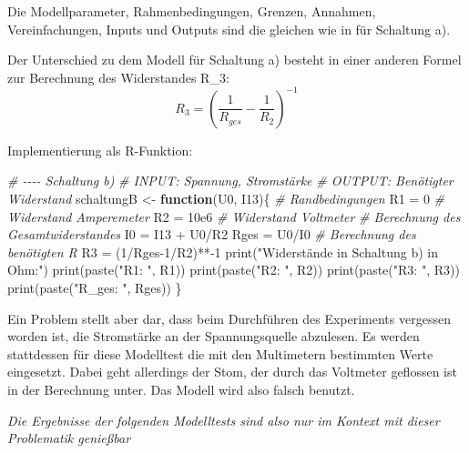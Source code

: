 \documentclass[class=article, crop=false]{standalone}
\newenvironment{Shaded}{\begin{snugshade}}{\end{snugshade}}
\newcommand{\CommentTok}[1]{\textcolor[rgb]{0.56,0.35,0.01}{\textit{#1}}}
\newcommand{\ControlFlowTok}[1]{\textcolor[rgb]{0.13,0.29,0.53}{\textbf{#1}}}
\newcommand{\DecValTok}[1]{\textcolor[rgb]{0.00,0.00,0.81}{#1}}
\newcommand{\FloatTok}[1]{\textcolor[rgb]{0.00,0.00,0.81}{#1}}
\newcommand{\FunctionTok}[1]{\textcolor[rgb]{0.00,0.00,0.00}{#1}}
\newcommand{\NormalTok}[1]{#1}
\newcommand{\OtherTok}[1]{\textcolor[rgb]{0.56,0.35,0.01}{#1}}
\newcommand{\SpecialCharTok}[1]{\textcolor[rgb]{0.00,0.00,0.00}{#1}}
\newcommand{\StringTok}[1]{\textcolor[rgb]{0.31,0.60,0.02}{#1}}
\begin{document}
Die Modellparameter, Rahmenbedingungen, Grenzen, Annahmen,
Vereinfachungen, Inputs und Outputs sind die gleichen wie in für
Schaltung a).

Der Unterschied zu dem Modell für Schaltung a) besteht in einer anderen
Formel zur Berechnung des Widerstandes R\_3:
\[R_3=(\frac{1}{R_{ges}}-\frac{1}{R_2})^{-1}\]

Implementierung als R-Funktion:

\begin{Shaded}
\begin{Highlighting}[]
\CommentTok{\# {-}{-}{-}{-} Schaltung b)}
\CommentTok{\# INPUT: Spannung, Stromstärke}
\CommentTok{\# OUTPUT: Benötigter Widerstand}
\NormalTok{schaltungB }\OtherTok{\textless{}{-}} \ControlFlowTok{function}\NormalTok{(U0, I13)\{}
  \CommentTok{\# Randbedingungen}
\NormalTok{  R1 }\OtherTok{=} \DecValTok{0} \CommentTok{\# Widerstand Amperemeter}
\NormalTok{  R2 }\OtherTok{=} \FloatTok{10e6} \CommentTok{\# Widerstand Voltmeter}
  \CommentTok{\# Berechnung des Gesamtwiderstandes}
\NormalTok{  I0 }\OtherTok{=}\NormalTok{ I13 }\SpecialCharTok{+}\NormalTok{ U0}\SpecialCharTok{/}\NormalTok{R2}
\NormalTok{  Rges }\OtherTok{=}\NormalTok{ U0}\SpecialCharTok{/}\NormalTok{I0}
  \CommentTok{\# Berechnung des benötigten R}
\NormalTok{  R3 }\OtherTok{=}\NormalTok{ (}\DecValTok{1}\SpecialCharTok{/}\NormalTok{Rges}\DecValTok{{-}1}\SpecialCharTok{/}\NormalTok{R2)}\SpecialCharTok{**{-}}\DecValTok{1}
  \FunctionTok{print}\NormalTok{(}\StringTok{"Widerstände in Schaltung b) in Ohm:"}\NormalTok{)}
  \FunctionTok{print}\NormalTok{(}\FunctionTok{paste}\NormalTok{(}\StringTok{"R1: "}\NormalTok{, R1))}
  \FunctionTok{print}\NormalTok{(}\FunctionTok{paste}\NormalTok{(}\StringTok{"R2: "}\NormalTok{, R2))}
  \FunctionTok{print}\NormalTok{(}\FunctionTok{paste}\NormalTok{(}\StringTok{"R3: "}\NormalTok{, R3))}
  \FunctionTok{print}\NormalTok{(}\FunctionTok{paste}\NormalTok{(}\StringTok{"R\_ges: "}\NormalTok{, Rges))}
\NormalTok{\}}
\end{Highlighting}
\end{Shaded}

Ein Problem stellt aber dar, dass beim Durchführen des Experiments
vergessen worden ist, die Stromstärke an der Spannungsquelle abzulesen.
Es werden stattdessen für diese Modelltest die mit den Multimetern
bestimmten Werte eingesetzt. Dabei geht allerdings der Stom, der durch
das Voltmeter geflossen ist in der Berechnung unter. Das Modell wird
also falsch benutzt.

\emph{Die Ergebnisse der folgenden Modelltests sind also nur im Kontext
mit dieser Problematik genießbar}
\end{document}

